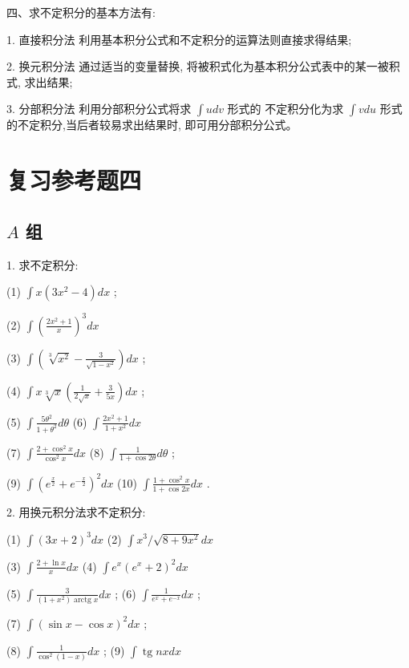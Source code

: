 \documentclass[lang=cn,newtx,10pt,scheme=chinese]{elegantbook}
\begin{document}
四、求不定积分的基本方法有:

1. 直接积分法 利用基本积分公式和不定积分的运算法则直接求得结果;

2. 换元积分法 通过适当的变量替换, 将被积式化为基本积分公式表中的某一被积式, 求出结果;

3. 分部积分法 利用分部积分公式将求 \(\int {udv}\) 形式的 不定积分化为求 \(\int {vdu}\) 形式的不定积分,当后者较易求出结果时, 即可用分部积分公式。

\chapter*{复习参考题四}

\section*{\(A\) 组}

1. 求不定积分:

(1) \(\int x\left( {3{x}^{2} - 4}\right) {dx}\) ;

(2) \(\int {\left( \frac{2{x}^{2} + 1}{x}\right) }^{3}{dx}\)

(3) \(\int \left( {\sqrt[3]{{x}^{2}} - \frac{3}{\sqrt{1 - {x}^{2}}}}\right) {dx}\) ;

(4) \(\int x\sqrt[3]{x}\left( {\frac{1}{2\sqrt{x}} + \frac{3}{5x}}\right) {dx}\) ;

(5) \(\int \frac{5{\theta }^{2}}{1 + {\theta }^{2}}{d\theta }\) (6) \(\int \frac{2{x}^{2} + 1}{1 + {x}^{2}}{dx}\)

(7) \(\int \frac{2 + {\cos }^{2}x}{{\cos }^{2}x}{dx}\) (8) \(\int \frac{1}{1 + \cos {2\theta }}{d\theta }\) ;

(9) \(\int {\left( {e}^{\frac{x}{2}} + {e}^{-\frac{x}{2}}\right) }^{2}{dx}\) (10) \(\int \frac{1 + {\cos }^{2}x}{1 + \cos {2x}}{dx}\) .

2. 用换元积分法求不定积分:

(1) \(\int {\left( 3x + 2\right) }^{3}{dx}\) (2) \(\int {x}^{3}/\sqrt{8 + 9{x}^{2}}{dx}\)

(3) \(\int \frac{2 + \ln x}{x}{dx}\) (4) \(\int {e}^{x}{\left( {e}^{x} + 2\right) }^{2}{dx}\)

(5) \(\int \frac{3}{\left( {1 + {x}^{2}}\right) \operatorname{arctg}x}{dx}\) ; (6) \(\int \frac{1}{{e}^{x} + {e}^{-x}}{dx}\) ;

(7) \(\int {\left( \sin x - \cos x\right) }^{2}{dx}\) ;

(8) \(\int \frac{1}{{\cos }^{2}\left( {1 - x}\right) }{dx}\) ; (9) \(\int \operatorname{tg}{nxdx}\)
\end{document}
